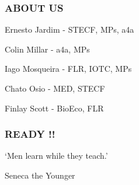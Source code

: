\documentclass[ignorenonframetext,]{beamer}
\begin{document}
\begin{frame}\frametitle{ABOUT US}

\begin{block}{Ernesto Jardim - STECF, MPs, a4a}

\end{block}

\begin{block}{Colin Millar - a4a, MPs}

\end{block}

\begin{block}{Iago Mosqueira - FLR, IOTC, MPs}

\end{block}

\begin{block}{Chato Osio - MED, STECF}

\end{block}

\begin{block}{Finlay Scott - BioEco, FLR}

\end{block}

\end{frame}

\begin{frame}\frametitle{READY !!}

`Men learn while they teach.'

Seneca the Younger

\end{frame}
\end{document}
